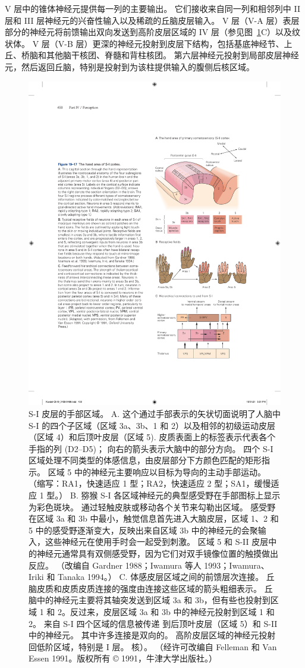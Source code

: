 V 层中的锥体神经元提供每一列的主要输出。
它们接收来自同一列和相邻列中 II 层和 III 层神经元的兴奋性输入以及稀疏的丘脑皮层输入。
V 层（V-A 层）表层部分的神经元将前馈输出双向发送到高阶皮层区域的 IV 层（参见图~\ref{fig:19_17}C）以及纹状体。
V 层（V-B 层）更深的神经元投射到皮层下结构，包括基底神经节、上丘、桥脑和其他脑干核团、脊髓和背柱核团。
第六层神经元投射到局部皮层神经元，然后返回丘脑，特别是投射到为该柱提供输入的腹侧后核区域。


\begin{figure}[htbp]
	\centering
	\includegraphics[width=0.5\linewidth]{chap19/fig_19_17}
	\caption{S-I 皮层的手部区域。 
		A. 这个通过手部表示的矢状切面说明了人脑中 S-I 的四个子区域（区域 3a、3b、1 和 2）以及相邻的初级运动皮层（区域 4）和后顶叶皮层（区域 5). 皮质表面上的标签表示代表各个手指的列 (D2–D5)； 向右的箭头表示大脑中的部分方向。
		四个 S-I 区域处理不同类型的体感信息，由皮层部分下方颜色匹配的矩形指示。
		区域 5 中的神经元主要响应以目标为导向的主动手部运动。 （缩写：RA1，快速适应 1 型；RA2，快速适应 2 型；SA1，缓慢适应 1 型。）
		B. 猕猴 S-I 各区域神经元的典型感受野在手部图标上显示为彩色斑块。
		通过轻触皮肤或移动各个关节来勾勒出区域。
		感受野在区域 3a 和 3b 中最小，触觉信息首先进入大脑皮层，区域 1、2 和 5 中的感受野逐渐变大，反映出来自区域 3b 中的神经元的会聚输入，这些神经元在使用手时会一起受到刺激。
		区域 5 和 S-II 皮层中的神经元通常具有双侧感受野，因为它们对双手镜像位置的触摸做出反应。 （改编自 Gardner 1988；Iwamura 等人 1993；Iwamura、Iriki 和 Tanaka 1994。）
		C. 体感皮层区域之间的前馈层次连接。 丘脑皮质和皮质皮质连接的强度由连接这些区域的箭头粗细表示。
		丘脑中的神经元主要将其轴突发送到区域 3a 和 3b，但有些也投射到区域 1 和 2。反过来，皮层区域 3a 和 3b 中的神经元投射到区域 1 和 2。
		来自 S-I 四个区域的信息被传递 到后顶叶皮层（区域 5）和 S-II 中的神经元。
		其中许多连接是双向的。 高阶皮层区域的神经元投射回低阶区域，特别是 I 层。 核）。 （经许可改编自 Felleman 和 Van Essen 1991。版权所有 © 1991，牛津大学出版社。）}
	\label{fig:19_17}
\end{figure}


